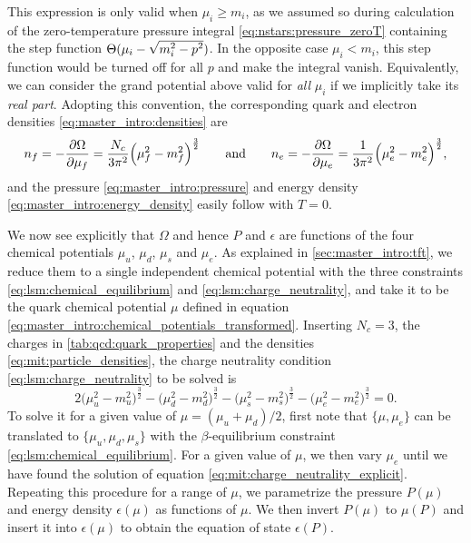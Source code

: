 This expression is only valid when $\mu_i \geq m_i$,
as we assumed so during calculation of the zero-temperature pressure integral \eqref{eq:nstars:pressure_zeroT} containing the step function $\Theta(\mu_i-\sqrt{\smash[b]{m_i^2-p^2}})$.
In the opposite case $\mu_i < m_i$, this step function would be turned off for all $p$ and make the integral vanish.
Equivalently, we can consider the grand potential above valid for \emph{all} $\mu_i$ if we implicitly take its \emph{real part}.
Adopting this convention, the corresponding quark and electron densities \eqref{eq:master_intro:densities} are
\begin{equation}
	n_f = -\pdv{\Omega}{\mu_f} = \frac{N_c}{3 \pi^2} \Big( \mu_f^2 - m_f^2 \Big)^{\frac32}
	\qquad \text{and} \qquad
	n_e = -\pdv{\Omega}{\mu_e} = \frac{  1}{3 \pi^2} \Big( \mu_e^2 - m_e^2 \Big)^{\frac32},
\label{eq:mit:particle_densities}%
\end{equation}
and the pressure \eqref{eq:master_intro:pressure} and energy density \eqref{eq:master_intro:energy_density} easily follow with $T=0$.

We now see explicitly that $\Omega$ and hence $P$ and $\epsilon$ are functions of the four chemical potentials $\mu_u$, $\mu_d$, $\mu_s$ and $\mu_e$.
As explained in \cref{sec:master_intro:tft},
we reduce them to a single independent chemical potential with the three constraints \eqref{eq:lsm:chemical_equilibrium} and \eqref{eq:lsm:charge_neutrality},
and take it to be the quark chemical potential $\mu$ defined in equation \eqref{eq:master_intro:chemical_potentials_transformed}.
Inserting $N_c=3$, the charges in \cref{tab:qcd:quark_properties} and the densities \eqref{eq:mit:particle_densities},
the charge neutrality condition \eqref{eq:lsm:charge_neutrality} to be solved is
\begin{equation}
	2 \Big(\mu_u^2-m_u^2\Big)^\frac32
	- \Big(\mu_d^2-m_d^2\Big)^\frac32 
	- \Big(\mu_s^2-m_s^2\Big)^\frac32 
	- \Big(\mu_e^2-m_e^2\Big)^\frac32 = 0.
\label{eq:mit:charge_neutrality_explicit}
\end{equation}
To solve it for a given value of $\mu=(\mu_u+\mu_d)/2$,
first note that $\{\mu,\mu_e\}$
can be translated to $\{\mu_u,\mu_d,\mu_s\}$ with the $\beta$-equilibrium constraint \eqref{eq:lsm:chemical_equilibrium}.
For a given value of $\mu$, we then vary $\mu_e$ until we have found the solution of equation \eqref{eq:mit:charge_neutrality_explicit}.
Repeating this procedure for a range of $\mu$,
we parametrize the pressure $P(\mu)$ and energy density $\epsilon(\mu)$ as functions of $\mu$.
We then invert $P(\mu)$ to $\mu(P)$ and insert it into $\epsilon(\mu)$ to obtain the equation of state $\epsilon(P)$.

